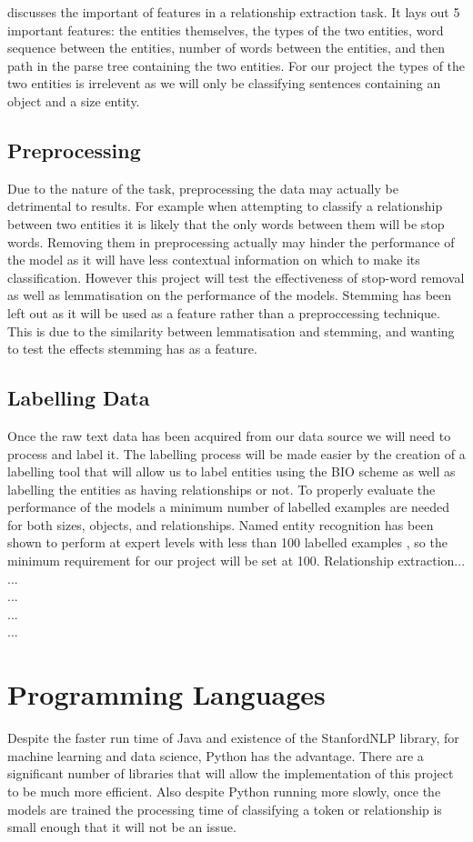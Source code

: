 \documentclass[11pt,oneside]{book}
\begin{document}
\citet{refeatures} discusses the important of features in a relationship extraction task. It lays out 5 important features: the entities themselves, the types of the two entities, word sequence between the entities, number of words between the entities, and then path in the parse tree containing the two entities. For our project the types of the two entities is irrelevent as we will only be classifying sentences containing an object and a size entity.

\subsection{Preprocessing}
Due to the nature of the task, preprocessing the data may actually be detrimental to results. For example when attempting to classify a relationship between two entities it is likely that the only words between them will be stop words. Removing them in preprocessing actually may hinder the performance of the model as it will have less contextual information on which to make its classification. However this project will test the effectiveness of stop-word removal as well as lemmatisation on the performance of the models. Stemming has been left out as it will be used as a feature rather than a preproccessing technique. This is due to the similarity between lemmatisation and stemming, and wanting to test the effects stemming has as a feature.

\subsection{Labelling Data}
Once the raw text data has been acquired from our data source we will need to process and label it. The labelling process will be made easier by the creation of a labelling tool that will allow us to label entities using the BIO scheme as well as labelling the entities as having relationships or not. To properly evaluate the performance of the models a minimum number of labelled examples are needed for both sizes, objects, and relationships.  Named entity recognition has been shown to perform at expert levels with less than 100 labelled examples \citep{not_many_training_ner}, so the minimum requirement for our project will be set at 100. Relationship extraction... \\ ... \\ ... \\ ... \\ ...

\section{Programming Languages}
Despite the faster run time of Java and existence of the StanfordNLP library, for machine learning and data science, Python has the advantage. There are a significant number of libraries that will allow the implementation of this project to be much more efficient. Also despite Python running more slowly, once the models are trained the processing time of classifying a token or relationship is small enough that it will not be an issue.
\end{document}
